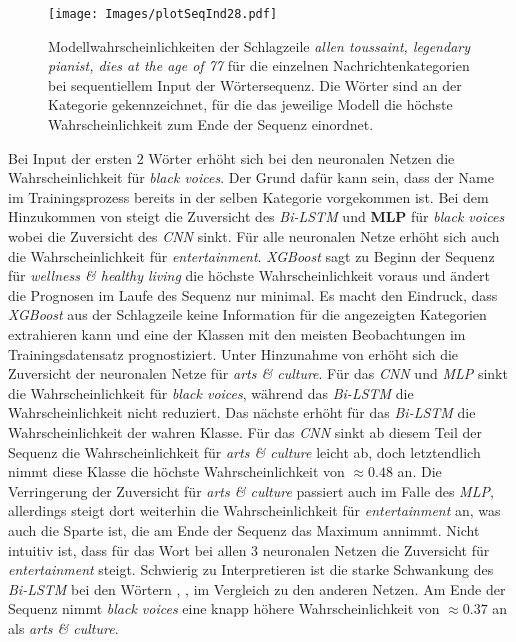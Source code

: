 \documentclass[a4paper,11pt]{article}
\begin{document}
\begin{figure}[!ht]
    \centering
\texttt{[image: Images/plotSeqInd28.pdf]} 
\caption{Modellwahrscheinlichkeiten der Schlagzeile \textit{allen toussaint, legendary pianist, dies at the age of 77} für die einzelnen Nachrichtenkategorien bei sequentiellem Input der Wörtersequenz. Die Wörter sind an der Kategorie gekennzeichnet, für die das jeweilige Modell die höchste Wahrscheinlichkeit zum Ende der Sequenz einordnet.}
\label{abb:plotSeqInd28}
\end{figure}

Bei Input der ersten $2$ Wörter  erhöht sich bei den neuronalen Netzen die Wahrscheinlichkeit für \textit{black voices}. Der Grund dafür kann sein, dass der Name im Trainingsprozess bereits in der selben Kategorie vorgekommen ist. Bei dem Hinzukommen von  steigt die Zuversicht des \textit{Bi-LSTM} und \textbf{MLP} für \textit{black voices} wobei die Zuversicht des \textit{CNN} sinkt. Für alle neuronalen Netze erhöht sich auch die Wahrscheinlichkeit für \textit{entertainment}. \textit{XGBoost} sagt zu Beginn der Sequenz für \textit{wellness \& healthy living} die höchste Wahrscheinlichkeit voraus und ändert die Prognosen im Laufe des Sequenz nur minimal. Es macht den Eindruck, dass \textit{XGBoost} aus der Schlagzeile keine Information für die angezeigten Kategorien extrahieren kann und eine der Klassen mit den meisten Beobachtungen im Trainingsdatensatz prognostiziert. Unter Hinzunahme von  erhöht sich die Zuversicht der neuronalen Netze für \textit{arts \& culture}. Für das \textit{CNN} und \textit{MLP} sinkt die Wahrscheinlichkeit für \textit{black voices}, während das \textit{Bi-LSTM} die Wahrscheinlichkeit nicht reduziert. Das nächste \say{\textit{,}} erhöht für das \textit{Bi-LSTM} die Wahrscheinlichkeit der wahren Klasse. Für das \textit{CNN} sinkt ab diesem Teil der Sequenz die Wahrscheinlichkeit für \textit{arts \& culture} leicht ab, doch letztendlich nimmt diese Klasse die höchste Wahrscheinlichkeit von $\approx 0.48$ an. Die Verringerung der Zuversicht für \textit{arts \& culture} passiert auch im Falle des \textit{MLP}, allerdings steigt dort weiterhin die Wahrscheinlichkeit für \textit{entertainment} an, was auch die Sparte ist, die am Ende der Sequenz das Maximum annimmt. Nicht intuitiv ist, dass für das Wort  bei allen $3$ neuronalen Netzen die Zuversicht für \textit{entertainment} steigt. Schwierig zu Interpretieren ist die starke Schwankung des \textit{Bi-LSTM} bei den Wörtern , ,  im Vergleich zu den anderen Netzen. Am Ende der Sequenz nimmt \textit{black voices} eine knapp höhere Wahrscheinlichkeit von $\approx 0.37$ an als \textit{arts \& culture}.\\
\end{document}
